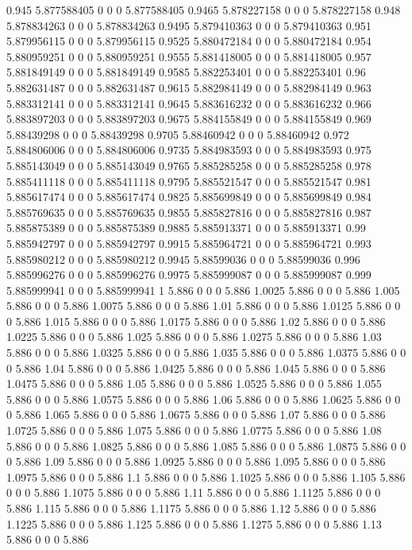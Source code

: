 {0.945 5.877588405 0 0 0 5.877588405
0.9465 5.878227158 0 0 0 5.878227158
0.948 5.878834263 0 0 0 5.878834263
0.9495 5.879410363 0 0 0 5.879410363
0.951 5.879956115 0 0 0 5.879956115
0.9525 5.880472184 0 0 0 5.880472184
0.954 5.880959251 0 0 0 5.880959251
0.9555 5.881418005 0 0 0 5.881418005
0.957 5.881849149 0 0 0 5.881849149
0.9585 5.882253401 0 0 0 5.882253401
0.96 5.882631487 0 0 0 5.882631487
0.9615 5.882984149 0 0 0 5.882984149
0.963 5.883312141 0 0 0 5.883312141
0.9645 5.883616232 0 0 0 5.883616232
0.966 5.883897203 0 0 0 5.883897203
0.9675 5.884155849 0 0 0 5.884155849
0.969 5.88439298 0 0 0 5.88439298
0.9705 5.88460942 0 0 0 5.88460942
0.972 5.884806006 0 0 0 5.884806006
0.9735 5.884983593 0 0 0 5.884983593
0.975 5.885143049 0 0 0 5.885143049
0.9765 5.885285258 0 0 0 5.885285258
0.978 5.885411118 0 0 0 5.885411118
0.9795 5.885521547 0 0 0 5.885521547
0.981 5.885617474 0 0 0 5.885617474
0.9825 5.885699849 0 0 0 5.885699849
0.984 5.885769635 0 0 0 5.885769635
0.9855 5.885827816 0 0 0 5.885827816
0.987 5.885875389 0 0 0 5.885875389
0.9885 5.885913371 0 0 0 5.885913371
0.99 5.885942797 0 0 0 5.885942797
0.9915 5.885964721 0 0 0 5.885964721
0.993 5.885980212 0 0 0 5.885980212
0.9945 5.88599036 0 0 0 5.88599036
0.996 5.885996276 0 0 0 5.885996276
0.9975 5.885999087 0 0 0 5.885999087
0.999 5.885999941 0 0 0 5.885999941
1 5.886 0 0 0 5.886
1.0025 5.886 0 0 0 5.886
1.005 5.886 0 0 0 5.886
1.0075 5.886 0 0 0 5.886
1.01 5.886 0 0 0 5.886
1.0125 5.886 0 0 0 5.886
1.015 5.886 0 0 0 5.886
1.0175 5.886 0 0 0 5.886
1.02 5.886 0 0 0 5.886
1.0225 5.886 0 0 0 5.886
1.025 5.886 0 0 0 5.886
1.0275 5.886 0 0 0 5.886
1.03 5.886 0 0 0 5.886
1.0325 5.886 0 0 0 5.886
1.035 5.886 0 0 0 5.886
1.0375 5.886 0 0 0 5.886
1.04 5.886 0 0 0 5.886
1.0425 5.886 0 0 0 5.886
1.045 5.886 0 0 0 5.886
1.0475 5.886 0 0 0 5.886
1.05 5.886 0 0 0 5.886
1.0525 5.886 0 0 0 5.886
1.055 5.886 0 0 0 5.886
1.0575 5.886 0 0 0 5.886
1.06 5.886 0 0 0 5.886
1.0625 5.886 0 0 0 5.886
1.065 5.886 0 0 0 5.886
1.0675 5.886 0 0 0 5.886
1.07 5.886 0 0 0 5.886
1.0725 5.886 0 0 0 5.886
1.075 5.886 0 0 0 5.886
1.0775 5.886 0 0 0 5.886
1.08 5.886 0 0 0 5.886
1.0825 5.886 0 0 0 5.886
1.085 5.886 0 0 0 5.886
1.0875 5.886 0 0 0 5.886
1.09 5.886 0 0 0 5.886
1.0925 5.886 0 0 0 5.886
1.095 5.886 0 0 0 5.886
1.0975 5.886 0 0 0 5.886
1.1 5.886 0 0 0 5.886
1.1025 5.886 0 0 0 5.886
1.105 5.886 0 0 0 5.886
1.1075 5.886 0 0 0 5.886
1.11 5.886 0 0 0 5.886
1.1125 5.886 0 0 0 5.886
1.115 5.886 0 0 0 5.886
1.1175 5.886 0 0 0 5.886
1.12 5.886 0 0 0 5.886
1.1225 5.886 0 0 0 5.886
1.125 5.886 0 0 0 5.886
1.1275 5.886 0 0 0 5.886
1.13 5.886 0 0 0 5.886
}
